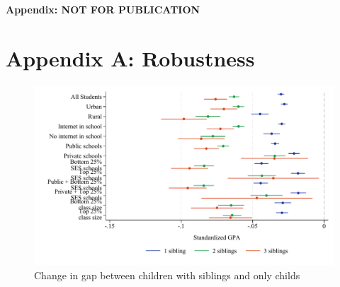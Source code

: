 \clearpage

\setcounter{figure}{0}
\renewcommand\thefigure{A\thechapter.\arabic{figure}}    

\setcounter{table}{0}
\renewcommand{\thetable}{A\thechapter.\arabic{table}}


\begin{center}
\huge
\textbf{Appendix: NOT FOR PUBLICATION}
\normalsize
\end{center}


\section*{Appendix A: Robustness} \label{sec:appa}
\newpage




\newpage














\begin{figure}[htbp]
    \centering
    
        \includegraphics[width=\textwidth]{./FIGURES/TWFE/covid_twfe_A_bysibs_elm_all_gpa_m_adj_Tsiblings_Soldest_4.pdf}
        \caption{Change in gap between children with siblings and only childs}
        \label{fig:fig_appA}

\end{figure}

